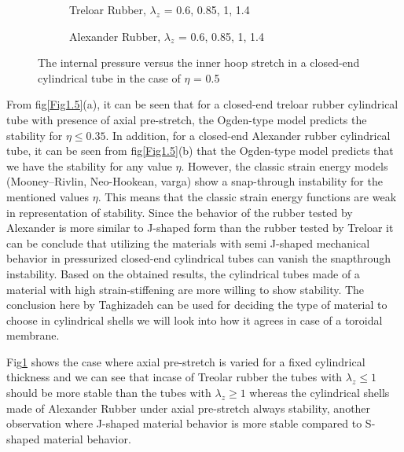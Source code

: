 \documentclass[12pt]{report}
\begin{document}
\pagebreak

\begin{figure}[!ht]
	\centering
	\begin{subfigure}{0.47\textwidth}
			\centering
			\caption{Treloar Rubber, $\lambda_{z}$ = 0.6, 0.85, 1, 1.4}
		\end{subfigure}
		\begin{subfigure}{0.47\textwidth}
			\centering
			\caption{Alexander Rubber, $\lambda_{z}$ = 0.6, 0.85, 1, 1.4}
		\end{subfigure}
	\caption{The internal pressure versus the inner hoop stretch in a closed-end cylindrical tube in the case of $\eta$ = 0.5}
	\centering
	\label{Fig1.6}
\end{figure}

From fig\ref{Fig1.5}(a), it can be seen that for a closed-end treloar rubber cylindrical tube with presence of axial pre-stretch, the Ogden-type model predicts the stability for $\eta\leq0.35$. In addition, for a closed-end Alexander rubber cylindrical tube, it can be seen from fig\ref{Fig1.5}(b) that the Ogden-type model predicts that we have the stability for any value $\eta$. However, the classic strain energy models (Mooney–Rivlin, Neo-Hookean, varga) show a snap-through instability for the mentioned values $\eta$. This means that the classic strain energy functions are weak in representation of stability. Since the behavior of the rubber tested by Alexander is more similar to J-shaped form than the rubber
tested by Treloar it can be conclude that utilizing the materials with semi J-shaped
mechanical behavior in pressurized closed-end cylindrical tubes can vanish the snapthrough instability. Based on the obtained results, the cylindrical tubes made of a
material with high strain-stiffening are more willing to show stability. The conclusion here by Taghizadeh\cite{snap} can be used for deciding the type of material to choose in cylindrical shells we will look into how it agrees in case of a toroidal membrane.

Fig\ref{Fig1.6} shows the case where axial pre-stretch is varied for a fixed cylindrical thickness and we can see that incase of Treolar rubber the tubes with $\lambda_{z}\leq1$ should be more stable than the tubes with $\lambda_{z}\geq1$ whereas the cylindrical shells made of Alexander Rubber under axial pre-stretch always stability, another observation where J-shaped material behavior is more stable compared to S-shaped material behavior.
\end{document}
